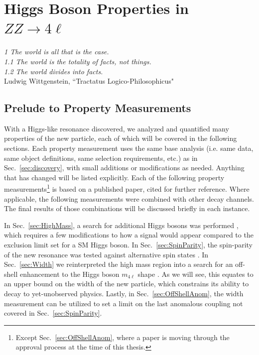 \chapter{Higgs Boson Properties in $ZZ\rightarrow4\ell$}
\label{sec:properties}

\begin{center}
\begin{footnotesize}
\textit{1 The world is all that is the case. \\
1.1 The world is the totality of facts, not things.\\
1.2 The world divides into facts.}\\
Ludwig Wittgenstein, ``Tractatus Logico-Philosophicus"
\end{footnotesize}
\end{center}

\section{Prelude to Property Measurements}
\label{sec:Prelude}

With a Higgs-like resonance discovered, we analyzed and quantified many properties of the new particle, each of which will be covered in the following sections. Each property measurement uses the same base analysis (i.e. same data, same object definitions, same selection requirements, etc.) as in Sec.~\ref{sec:discovery}, with small additions or modifications as needed. Anything that has changed will be listed explicitly. Each of the following property measurements\footnote{Except Sec.~\ref{sec:OffShellAnom}, where a paper is moving through the approval process at the time of this thesis.} is based on a published paper, cited for further reference. Where applicable, the following measurements were combined with other decay channels. The final results of those combinations will be discussed briefly in each instance.

In Sec.~\ref{sec:HighMass}, a search for additional Higgs bosons was performed \cite{Khachatryan:2015cwa}, which requires a few modifications to how a signal would appear compared to the exclusion limit set for a SM Higgs boson. In Sec.~\ref{sec:SpinParity}, the spin-parity of the new resonance was tested against alternative spin states \cite{Khachatryan:2014kca}. In Sec.~\ref{sec:Width} we reinterpreted the high mass region into a search for an off-shell enhancement to the Higgs boson $m_{4\ell}$ shape \cite{Khachatryan:2014iha}. As we will see, this equates to an upper bound on the width of the new particle, which constrains its ability to decay to yet-unobserved physics. Lastly, in Sec.~\ref{sec:OffShellAnom}, the width measurement can be utilized to set a limit on the last anomalous coupling not covered in Sec.~\ref{sec:SpinParity}.

